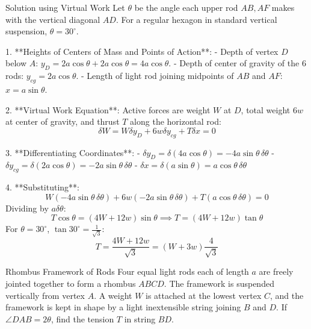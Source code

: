 \documentclass[11pt,a4paper]{article}
\begin{document}
\begin{proofbox}{Solution using Virtual Work}
Let $\theta$ be the angle each upper rod $AB, AF$ makes with the vertical diagonal $AD$.
For a regular hexagon in standard vertical suspension, $\theta = 30^\circ$.

1. **Heights of Centers of Mass and Points of Action**:
   - Depth of vertex $D$ below $A$: $y_D = 2a\cos\theta + 2a\cos\theta = 4a\cos\theta$.
   - Depth of center of gravity of the 6 rods: $y_{cg} = 2a\cos\theta$.
   - Length of light rod joining midpoints of $AB$ and $AF$: $x = a\sin\theta$.

2. **Virtual Work Equation**:
   Active forces are weight $W$ at $D$, total weight $6w$ at center of gravity, and thrust $T$ along the horizontal rod:
   \begin{equation}
   \delta W = W \delta y_D + 6w \delta y_{cg} + T \delta x = 0
   \end{equation}

3. **Differentiating Coordinates**:
   - $\delta y_D = \delta(4a\cos\theta) = -4a\sin\theta \, \delta\theta$
   - $\delta y_{cg} = \delta(2a\cos\theta) = -2a\sin\theta \, \delta\theta$
   - $\delta x = \delta(a\sin\theta) = a\cos\theta \, \delta\theta$

4. **Substituting**:
   \[
   W(-4a\sin\theta \, \delta\theta) + 6w(-2a\sin\theta \, \delta\theta) + T(a\cos\theta \, \delta\theta) = 0
   \]
   Dividing by $a\delta\theta$:
   \[
   T\cos\theta = (4W + 12w)\sin\theta \implies T = (4W + 12w)\tan\theta
   \]
   For $\theta = 30^\circ$, $\tan 30^\circ = \frac{1}{\sqrt{3}}$:
   \begin{equation}
   T = \frac{4W + 12w}{\sqrt{3}} = (W + 3w) \frac{4}{\sqrt{3}}
   \end{equation}
\end{proofbox}

\begin{examplebox}{Rhombus Framework of Rods}
Four equal light rods each of length $a$ are freely jointed together to form a rhombus $ABCD$. The framework is suspended vertically from vertex $A$. A weight $W$ is attached at the lowest vertex $C$, and the framework is kept in shape by a light inextensible string joining $B$ and $D$. If $\angle DAB = 2\theta$, find the tension $T$ in string $BD$.
\end{examplebox}
\end{document}
